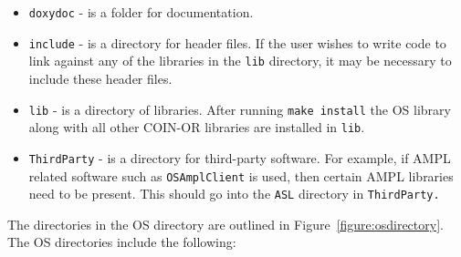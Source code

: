 \documentclass[11pt]{article}
\newcounter{Fig}
\renewcommand{\_}{{\char"5F}}
\renewcommand{\{}{{\char"7B}}
\renewcommand{\}}{{\char"7D}}
\renewcommand{\^}{{\char"0D}}
\renewcommand{\'}{{\char"0D}}
\begin{document}
\begin{enumerate}[Step 1:]
\begin{itemize}
\item {\tt doxydoc} - is a folder for documentation.

\item {\tt include} - is a directory for header files. If the user wishes to write code to link against any of the libraries in the {\tt lib} directory, it may be necessary to include these header files.

\item {\tt lib} - is a directory of libraries. After running {\tt make install} the OS library along with all other COIN-OR libraries are installed in {\tt lib}.

\item {\tt ThirdParty} - is a  directory for third-party software. For example, if AMPL related software  
such as {\tt OSAmplClient} is used, then certain AMPL libraries need to be present. 
This should go into the {\tt ASL} directory in {\tt ThirdParty.}
\end{itemize}


The directories in the OS directory are outlined in Figure~\ref{figure:osdirectory}.  The OS directories include the following:



\end{enumerate}
\end{document}
